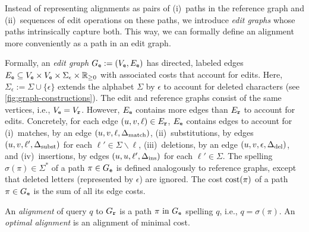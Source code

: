 Instead of representing alignments as pairs of (i)~paths in the reference graph and
(ii)~sequences of edit operations on these paths, we introduce \textit{edit
graphs} whose paths intrinsically capture both. This way, we can
formally define an alignment more conveniently as a path in an edit graph.

Formally, an \emph{edit graph} $G_\texttt{e}:=(V_\texttt{e},E_\texttt{e})$ has directed, labeled edges
$E_\texttt{e} \subseteq V_\texttt{e} \times V_\texttt{e} \times \Sigma_\epsilon \times \mathbb{R}_{\geq
0}$ with associated costs that account for edits. Here, $\Sigma_\epsilon :=
\Sigma \cup \{\epsilon\}$ extends the alphabet $\Sigma$ by $\epsilon$ to account
for deleted characters (see \cref{fig:graph-constructions}).
%
The edit and reference graphs consist
of the same vertices, i.e., $V_\texttt{e}=V_\texttt{r}$. However, $E_\texttt{e}$ contains more edges
than $E_\texttt{r}$ to account for edits.
%
Concretely, for each edge $(u,v,\ell) \in E_\texttt{r}$, $E_\texttt{e}$ contains edges to
account for (i)~matches, by an edge $(u,v,\ell,\Delta_\text{match})$, (ii)~substitutions, by
edges $(u,v,\ell',\Delta_\text{subst})$ for each $\ell' \in \Sigma \backslash \ell$,
(iii)~deletions, by an edge $(u,v,\epsilon,\Delta_\text{del})$, and (iv)~insertions, by
edges $(u,u,\ell',\Delta_\text{ins})$ for each $\ell' \in \Sigma$.
%
The spelling $\sigma(\pi) \in \Sigma^*$ of a path $\pi \in G_\texttt{e}$ is defined
analogously to reference graphs, except that deleted letters (represented by
$\epsilon$) are ignored. The cost $\text{cost}(\pi)$ of a path $\pi \in G_\texttt{e}$ is the
sum of all its edge costs.

An \emph{alignment} of query $q$ to $G_\texttt{r}$ is a path $\pi \text{ in } G_\texttt{e}$
spelling $q$, i.e., $q=\sigma(\pi)$. An \emph{optimal alignment} is an alignment
of minimal cost.
